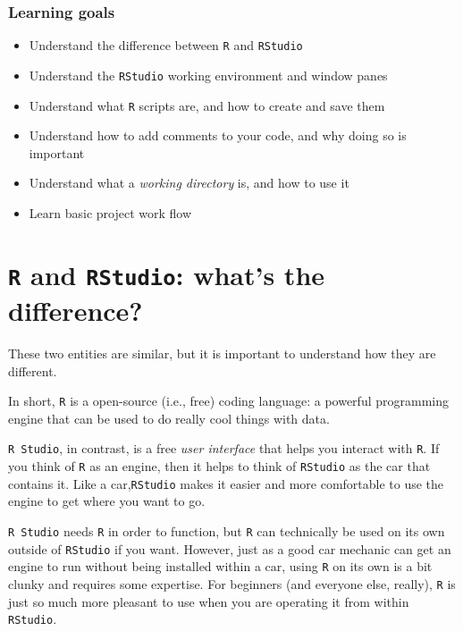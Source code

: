 \documentclass[]{book}
\providecommand{\tightlist}{%
  \setlength{\itemsep}{0pt}\setlength{\parskip}{0pt}}
\begin{document}
\hypertarget{learning-goals-1}{%
\subsubsection*{Learning goals}\label{learning-goals-1}}

\begin{itemize}
\tightlist
\item
  Understand the difference between \texttt{R} and \texttt{RStudio}
\item
  Understand the \texttt{RStudio} working environment and window panes\\
\item
  Understand what \texttt{R} scripts are, and how to create and save them
\item
  Understand how to add comments to your code, and why doing so is important
\item
  Understand what a \emph{working directory} is, and how to use it
\item
  Learn basic project work flow
\end{itemize}

\hypertarget{r-and-rstudio-whats-the-difference}{%
\section*{\texorpdfstring{\texttt{R} and \texttt{RStudio}: what's the difference?}{R and RStudio: what's the difference?}}\label{r-and-rstudio-whats-the-difference}}

These two entities are similar, but it is important to understand how they are different.

In short, \texttt{R} is a open-source (i.e., free) coding language: a powerful programming engine that can be used to do really cool things with data.

\texttt{R\ Studio}, in contrast, is a free \emph{user interface} that helps you interact with \texttt{R}. If you think of \texttt{R} as an engine, then it helps to think of \texttt{RStudio} as the car that contains it. Like a car,\texttt{RStudio} makes it easier and more comfortable to use the engine to get where you want to go.

\texttt{R\ Studio} needs \texttt{R} in order to function, but \texttt{R} can technically be used on its own outside of \texttt{RStudio} if you want. However, just as a good car mechanic can get an engine to run without being installed within a car, using \texttt{R} on its own is a bit clunky and requires some expertise. For beginners (and everyone else, really), \texttt{R} is just so much more pleasant to use when you are operating it from within \texttt{RStudio}.
\end{document}

